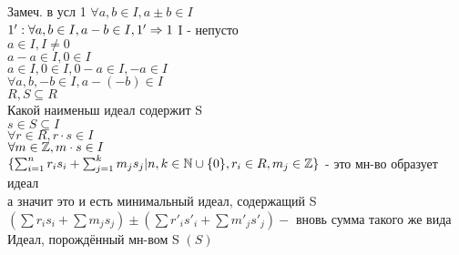 Замеч. в усл 1 $ \forall a,b \in I, a \pm b \in I $\\
$ 1' : \forall a,b \in I, a-b \in I , \\
1' \Rightarrow 1 $ I - непусто \\
$ a \in I, I \neq 0 $ \\
$ a - a \in I, 0 \in I $\\
$ a \in I, 0 \in  I, 0 - a \in I, -a \in I $\\
$ \forall a,b, -b \in I, a - (-b) \in I $\\

$ R, S \subseteq R $ \\
Какой наименьш идеал содержит S \\
$ s \in S \subseteq I $ \\
$ \forall r \in R, r \cdot s \in I $\\
$ \forall m \in \mathbb{Z}, m \cdot s \in I $ \\
$ \{ \sum_{i=1}^{n} r_is_i + \sum_{j=1}^{k} m_js_j | n, k \in \mathbb{N} \cup \{0\}, r_i \in R, m_j \in \mathbb{Z} \} $ - это мн-во образует идеал \\
а значит это и есть минимальный идеал, содержащий S \\
$ (\sum r_is_i + \sum m_js_j) \pm  (\sum r'_is'_i + \sum m'_js'_j) - $ вновь сумма такого же вида \\
Идеал, порождённый мн-вом S $ (S) $ \\













